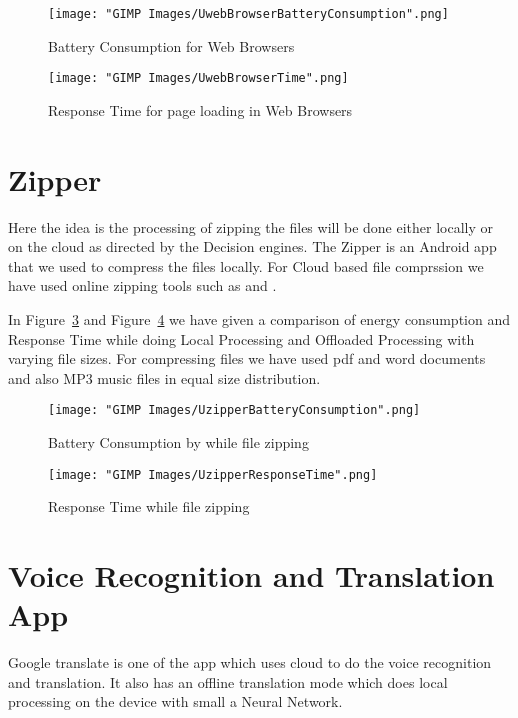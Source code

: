 \documentclass{report}
\begin{document}
\begin{figure}[h!]
  \centering
  \texttt{[image: "GIMP Images/UwebBrowserBatteryConsumption".png]}
  \caption{Battery Consumption for Web Browsers}
  \label{fig:UwebBrowserBatteryConsumption}
\end{figure}

\begin{figure}[h!]
  \centering
  \texttt{[image: "GIMP Images/UwebBrowserTime".png]}
  \caption{Response Time for page loading in Web Browsers}
  \label{fig:UwebBrowserTime}
\end{figure}

\section{Zipper} %
Here the idea is the processing of zipping the files will be done either locally or on the cloud as directed by the Decision engines. 
The Zipper is an Android app that we used to compress the files locally. For Cloud based file comprssion we have used online zipping tools such as \cite{ezyZip} and \cite{olconvert}.

In Figure~\ref{fig:UzipperBatteryConsumption} and Figure~\ref{fig:UzipperResponseTime} we have given a comparison of energy consumption and Response Time while doing Local Processing and Offloaded Processing with varying file sizes. For compressing files we have used pdf and word documents and also MP3 music files in equal size distribution.



\begin{figure}[h]
  \centering
  \texttt{[image: "GIMP Images/UzipperBatteryConsumption".png]}
  \caption{Battery Consumption by while file zipping}
  \label{fig:UzipperBatteryConsumption}
\end{figure}

\begin{figure}[h]
  \centering
  \texttt{[image: "GIMP Images/UzipperResponseTime".png]}
  \caption{Response Time while file zipping}
  \label{fig:UzipperResponseTime}
\end{figure}

\section{Voice Recognition and Translation App}
Google translate is one of the app which uses cloud to do the voice recognition and translation. It also has an offline translation mode which does local processing on the device with small a Neural Network. 
\end{document}
